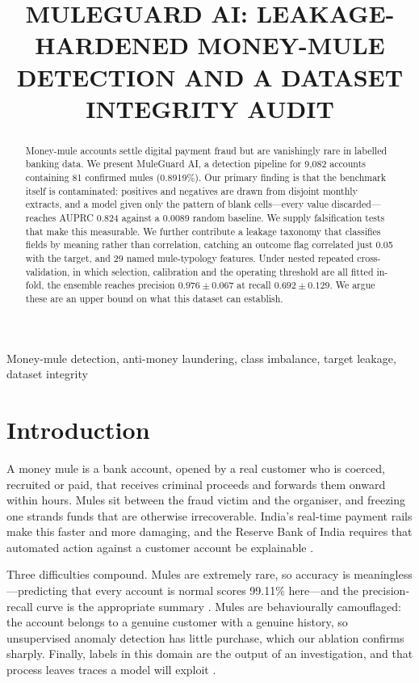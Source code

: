 \documentclass{article}
\title{MULEGUARD AI: LEAKAGE-HARDENED MONEY-MULE DETECTION AND A DATASET INTEGRITY AUDIT}
\begin{document}
\ninept
\maketitle

\begin{abstract}
Money-mule accounts settle digital payment fraud but are vanishingly rare in
labelled banking data. We present MuleGuard AI, a detection pipeline for
9,082 accounts containing 81 confirmed mules
(0.8919\%). Our primary finding is that the benchmark itself is
contaminated: positives and negatives are drawn from disjoint monthly extracts,
and a model given only the pattern of blank cells---every value discarded---reaches
AUPRC 0.824 against a 0.0089 random baseline. We supply
falsification tests that make this measurable. We further contribute a leakage
taxonomy that classifies fields by meaning rather than correlation, catching an
outcome flag correlated just 0.05 with the target, and 29 named
mule-typology features. Under nested repeated cross-validation, in which
selection, calibration and the operating threshold are all fitted in-fold, the
ensemble reaches precision $0.976 \pm 0.067$ at recall $0.692 \pm 0.129$. We
argue these are an upper bound on what this dataset can establish.
\end{abstract}

\begin{keywords}
Money-mule detection, anti-money laundering, class imbalance, target leakage,
dataset integrity
\end{keywords}

\section{Introduction}
\label{sec:intro}

A money mule is a bank account, opened by a real customer who is coerced,
recruited or paid, that receives criminal proceeds and forwards them onward
within hours. Mules sit between the fraud victim and the organiser, and freezing
one strands funds that are otherwise irrecoverable. India's real-time payment
rails make this faster and more damaging, and the Reserve Bank of India requires
that automated action against a customer account be explainable
\cite{rbi2016kyc}.

Three difficulties compound. Mules are extremely rare, so accuracy is
meaningless---predicting that every account is normal scores 99.11\% here---and
the precision-recall curve is the appropriate summary \cite{davis2006pr}. Mules
are behaviourally camouflaged: the account belongs to a genuine customer with a
genuine history, so unsupervised anomaly detection has little purchase, which our
ablation confirms sharply. Finally, labels in this domain are the output of an
investigation, and that process leaves traces a model will exploit
\cite{kaufman2012leakage}.
\end{document}
